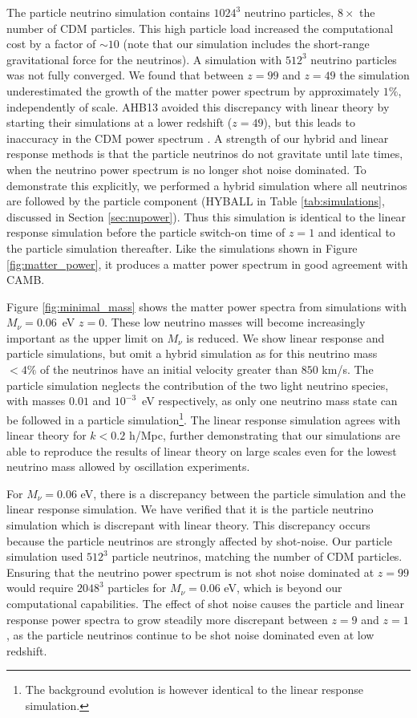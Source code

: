 \documentclass[useAMS, usenatbib]{mnras}
\begin{document}
The particle neutrino simulation contains $1024^3$ neutrino particles, $8\times$ the number of CDM particles. This high particle load increased the computational cost by a factor of $\sim 10$ (note that our simulation includes the short-range gravitational force for the neutrinos). A simulation with $512^3$ neutrino particles was not fully converged. We found that between $z=99$ and $z=49$ the simulation underestimated the growth of the matter power spectrum by approximately $1\%$, independently of scale. AHB13 avoided this discrepancy with linear theory by starting their simulations at a lower redshift ($z=49$), but this leads to inaccuracy in the CDM power spectrum \citep{Heitmann:2010}. A strength of our hybrid and linear response methods is that the particle neutrinos do not gravitate until late times, when the neutrino power spectrum is no longer shot noise dominated. To demonstrate this explicitly, we performed a hybrid simulation where all neutrinos are followed by the particle component (HYBALL in Table \ref{tab:simulations}, discussed in Section \ref{sec:nupower}). Thus this simulation is identical to the linear response simulation before the particle switch-on time of $z=1$ and identical to the particle simulation thereafter. Like the simulations shown in Figure \ref{fig:matter_power}, it produces a matter power spectrum in good agreement with CAMB.

Figure \ref{fig:minimal_mass} shows the matter power spectra from simulations with $M_\nu = 0.06$~eV $z=0$. These low neutrino masses will become increasingly important as the upper limit on $M_\nu$ is reduced. We show linear response and particle simulations, but omit a hybrid simulation as for this neutrino mass $ < 4\%$ of the neutrinos have an initial velocity greater than $850$ km/s. The particle simulation neglects the contribution of the two light neutrino species, with masses $0.01$ and $10^{-3}$~eV respectively, as only one neutrino mass state can be followed in a particle simulation\footnote{The background evolution is however identical to the linear response simulation.}. The linear response simulation agrees with linear theory for $k < 0.2$ h/Mpc, further demonstrating that our simulations are able to reproduce the results of linear theory on large scales even for the lowest neutrino mass allowed by oscillation experiments.

For $M_\nu = 0.06$ eV, there is a discrepancy between the particle simulation and the linear response simulation. We have verified that it is the particle neutrino simulation which is discrepant with linear theory. This discrepancy occurs because the particle neutrinos are strongly affected by shot-noise. Our particle simulation used $512^3$ particle neutrinos, matching the number of CDM particles. Ensuring that the neutrino power spectrum is not shot noise dominated at $z=99$ would require $2048^3$ particles for $M_\nu = 0.06$ eV, which is beyond our computational capabilities. The effect of shot noise causes the particle and linear response power spectra to grow steadily more discrepant between $z=9$ and $z=1$, as the particle neutrinos continue to be shot noise dominated even at low redshift.
\end{document}
